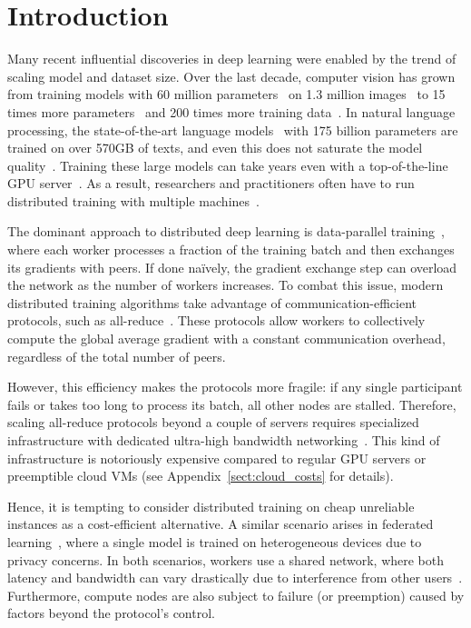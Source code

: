 \section{Introduction}\label{sect:intro}

Many recent influential discoveries in deep learning were enabled by the trend of scaling model and dataset size.
Over the last decade, computer vision has grown from training models with 60 million parameters~\cite{alexnet} on 1.3 million images~\cite{imagenet_cvpr09} to 15 times more parameters~\cite{Kolesnikov2020BigT} and 200 times more training data~\cite{jft-300m}. In natural language processing, the state-of-the-art language models~\cite{gpt3} with 175 billion parameters are trained on over 570GB of texts, and even this does not saturate the model quality~\cite{kaplan2020scaling}.
Training these large models can take years even with a top-of-the-line GPU server~\cite{gpt3costlambda}. As a result, researchers and practitioners often have to run distributed training with multiple machines~\cite{mlperf}.

The dominant approach to distributed deep learning is data-parallel training~\cite{valiant1990bridging}, where each worker processes a fraction of the training batch and then exchanges its gradients with peers. If done naïvely, the gradient exchange step can overload the network as the number of workers increases. To combat this issue, modern distributed training algorithms take advantage of communication-efficient protocols, such as all-reduce~\cite{bandwidth_optimal_allreduce}. These protocols 
allow workers to collectively compute the global average gradient with a constant communication overhead, regardless of the total number of peers.

However, this efficiency makes the protocols more fragile: if any single participant fails or takes too long to process its batch, all other nodes are stalled.
Therefore, scaling all-reduce protocols beyond a couple of servers requires specialized infrastructure with dedicated ultra-high bandwidth networking~\cite{mlperf}.
This kind of infrastructure is notoriously expensive compared to regular
GPU servers or preemptible cloud VMs (see Appendix~\ref{sect:cloud_costs} for details).

Hence, it is tempting to consider distributed training on cheap unreliable instances as a cost-efficient alternative. A similar scenario arises in federated learning~\cite{mcmahan2017communication}, where a single model is trained on heterogeneous devices due to privacy concerns.
In both scenarios, workers use a shared network, where both latency and bandwidth can vary drastically due to interference from other users~\cite{variability_azure}\nocite{variability_aws}. Furthermore, compute nodes are also subject to failure (or preemption) caused by factors beyond the protocol's control.

